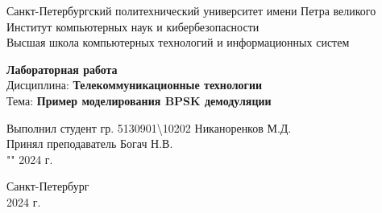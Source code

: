 \begingroup
\fontsize{12pt}{14pt}\selectfont

\begin{center}

    Санкт-Петербургский политехнический университет имени Петра великого\\
    Институт компьютерных наук и кибербезопасности\\
    Высшая школа компьютерных технологий и информационных систем\\

    \vspace{\fill}

    \onehalfspacing
    \textbf{\huge Лабораторная работа }\\
    \medbreak
    Дисциплина:\textbf{ Телекоммуникационные технологии}\\
    Тема: \textbf{ Пример моделирования BPSK демодуляции }\\
    \vspace{2.0cm}
\end{center}


\begin{flushright}
    \doublespacing
    Выполнил студент гр. 5130901{\textbackslash}10202 \underline{\hspace{7em}} Никаноренков М.Д.\\
    \smallskip
    Принял преподаватель \uline{\hspace{7em}}Богач Н.В. \\
    \smallskip
    "\uline{\hspace{1.5em}}" \uline{\hspace{5em}} 2024 г.\\
\end{flushright}

\vspace{\fill}

\begin{center}
    Санкт-Петербург\\
    2024 г.\\
\end{center}

\singlespacing

\pagebreak

\endgroup
